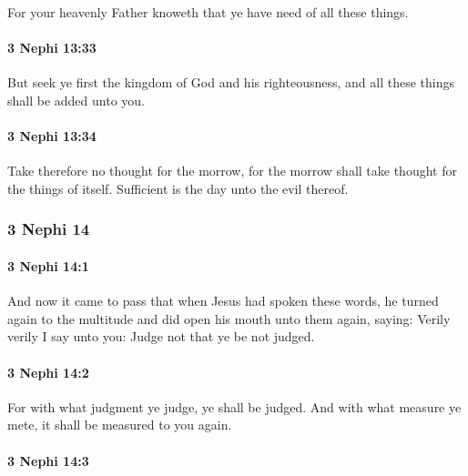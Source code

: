 			For your heavenly Father knoweth that ye have need of all these things.

		\paragraph{3 Nephi 13:33} %
			\label{3NEPHI-13-33}

			But seek ye first the kingdom of God and his righteousness,
			and all these things shall be added unto you.

		\paragraph{3 Nephi 13:34} %
			\label{3NEPHI-13-34}

			Take therefore no thought for the morrow,
			for the morrow shall take thought for the things of itself.
			Sufficient is the day unto the evil thereof.

	\subsubsection{3 Nephi 14} %
		\label{3NEPHI-14}
		
		\paragraph{3 Nephi 14:1} %
			\label{3NEPHI-14-1}

			And now it came to pass that
			when Jesus had spoken these words,
			he turned again to the multitude
			and did open his mouth unto them again, saying:
			Verily verily I say unto you:
			Judge not that ye be not judged.

		\paragraph{3 Nephi 14:2} %
			\label{3NEPHI-14-2}

			For with what judgment ye judge, ye shall be judged.
			And with what measure ye mete, it shall be measured to you again.

		\paragraph{3 Nephi 14:3} %
			\label{3NEPHI-14-3}

